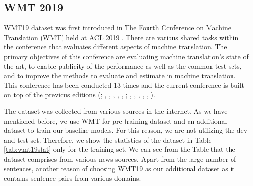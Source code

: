 \subsection{WMT 2019}
WMT19 dataset was first introduced in The Fourth Conference on Machine Translation (WMT) held at ACL 2019 \cite{barrault-etal-2019-findings}. There are various shared tasks within the conference that evaluates different aspects of machine translation. The primary objectives of this conference are evaluating machine translation's state of the art, to enable publicity of the performance as well as the common test sets, and to improve the methods to evaluate and estimate in machine translation. This conference has been conducted 13 times and the current conference is built on top of the previous editions (\cite{koehn-monz-2006-manual}; \cite{callison-burch-etal-2007-meta}, \cite{callison-burch-etal-2008-meta}, \cite{callison-burch-etal-2009-findings}, \cite{callison-burch-etal-2010-findings}, \cite{callison-burch-etal-2011-findings}, \cite{callison-burch-etal-2012-findings}; \cite{bojar-etal-2013-findings}, \cite{bojar-etal-2014-findings}, \cite{bojar-etal-2015-findings}, \cite{bojar-etal-2016-findings}, \cite{bojar-etal-2017-findings}, \cite{bojar-etal-2018-findings}).

The dataset was collected from various sources in the internet. As we have mentioned before, we use WMT for pre-training dataset and an additional dataset to train our baseline models. For this reason, we are not utilizing the dev and test set. Therefore, we show the statistics of the dataset in Table \ref{tab:wmt19stat} only for the training set. We can see from the Table that the dataset comprises from various news sources. Apart from the large number of sentences, another reason of choosing WMT19 as our additional dataset as it contains sentence pairs from various domains.

